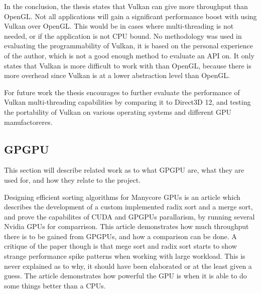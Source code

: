 In the conclusion, the thesis states that Vulkan can give more throughput than OpenGL. 
Not all applications will gain a significant performance boost with using Vulkan over OpenGL. 
This would be in cases where multi-threading is not needed, or if the application is not CPU bound. 
No methodology was used in evaluating the programmability of Vulkan, it is based on the personal experience of the author, which is not a good enough method to evaluate an \gls{API} on. 
It only states that Vulkan is more difficult to work with than OpenGL, because there is more overhead since Vulkan is at a lower abstraction level than OpenGL. 

For future work the thesis encourages to further evaluate the performance of Vulkan multi-threading  capabilities by comparing it to Direct3D 12, and testing the portability of Vulkan on various operating systems and different \gls{GPU} manufactoreres.

\subsection{\gls{GPGPU}}
This section will describe related work as to what GP\gls{GPU} are, what they are used for, and how they relate to the project.

Designing efficient sorting algorithms for Manycore \glspl{GPU} \cite{satish_2009_designing} is an article which describes the development of a custom implemented radix sort and a merge sort, and prove the capabilites of CUDA and \glspl{GPGPU} parallarism, by running several Nvidia \glspl{GPU} for comparrison. 
This article demonstrates how much throughput there is to be gained from \glspl{GPGPU}, and how a comparison can be done. 
A critique of the paper though is that mege sort and radix sort starts to show strange performance spike patterns when working with large workload. 
This is never explained as to why, it should have been elaborated or at the least given a guess.
The article demonstrates how powerful the \gls{GPU} is when it is able to do some things better than a \glspl{CPU}.

